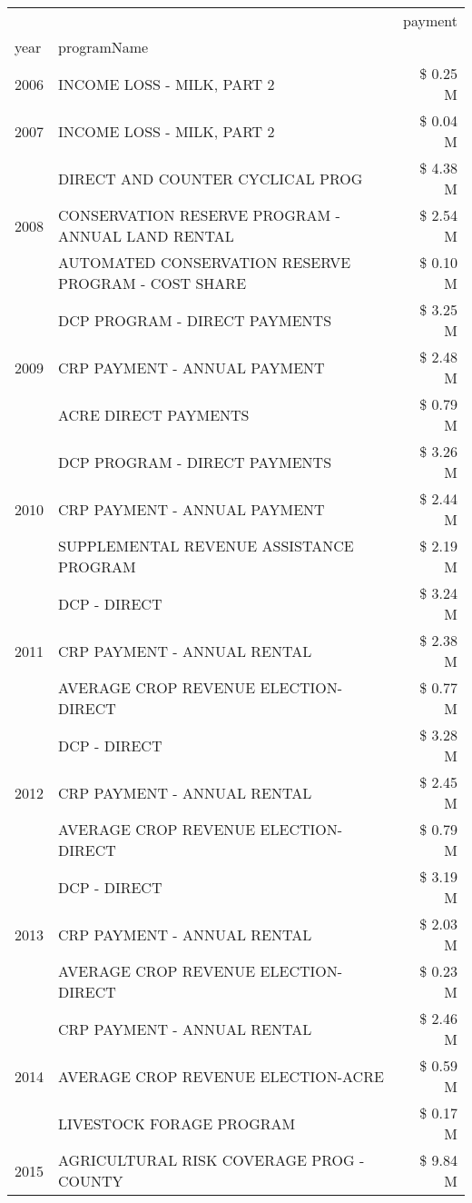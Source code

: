 \begin{tabular}{llr}
\toprule
 &  & payment \\
year & programName &  \\
\midrule
2006 & INCOME LOSS - MILK, PART 2 & \$ 0.25 M \\
\cline{1-3}
2007 & INCOME LOSS - MILK, PART 2 & \$ 0.04 M \\
\cline{1-3}
\multirow[t]{3}{*}{2008} & DIRECT AND COUNTER CYCLICAL PROG & \$ 4.38 M \\
 & CONSERVATION RESERVE PROGRAM - ANNUAL LAND RENTAL & \$ 2.54 M \\
 & AUTOMATED CONSERVATION RESERVE PROGRAM - COST SHARE & \$ 0.10 M \\
\cline{1-3}
\multirow[t]{3}{*}{2009} & DCP PROGRAM - DIRECT PAYMENTS & \$ 3.25 M \\
 & CRP PAYMENT - ANNUAL PAYMENT & \$ 2.48 M \\
 & ACRE DIRECT PAYMENTS & \$ 0.79 M \\
\cline{1-3}
\multirow[t]{3}{*}{2010} & DCP PROGRAM - DIRECT PAYMENTS & \$ 3.26 M \\
 & CRP PAYMENT - ANNUAL PAYMENT & \$ 2.44 M \\
 & SUPPLEMENTAL REVENUE ASSISTANCE PROGRAM & \$ 2.19 M \\
\cline{1-3}
\multirow[t]{3}{*}{2011} & DCP - DIRECT & \$ 3.24 M \\
 & CRP PAYMENT - ANNUAL RENTAL & \$ 2.38 M \\
 & AVERAGE CROP REVENUE ELECTION-DIRECT & \$ 0.77 M \\
\cline{1-3}
\multirow[t]{3}{*}{2012} & DCP - DIRECT & \$ 3.28 M \\
 & CRP PAYMENT - ANNUAL RENTAL & \$ 2.45 M \\
 & AVERAGE CROP REVENUE ELECTION-DIRECT & \$ 0.79 M \\
\cline{1-3}
\multirow[t]{3}{*}{2013} & DCP - DIRECT & \$ 3.19 M \\
 & CRP PAYMENT - ANNUAL RENTAL & \$ 2.03 M \\
 & AVERAGE CROP REVENUE ELECTION-DIRECT & \$ 0.23 M \\
\cline{1-3}
\multirow[t]{3}{*}{2014} & CRP PAYMENT - ANNUAL RENTAL & \$ 2.46 M \\
 & AVERAGE CROP REVENUE ELECTION-ACRE & \$ 0.59 M \\
 & LIVESTOCK FORAGE PROGRAM & \$ 0.17 M \\
\cline{1-3}
\multirow[t]{3}{*}{2015} & AGRICULTURAL RISK COVERAGE PROG - COUNTY & \$ 9.84 M \\

\end{tabular}
